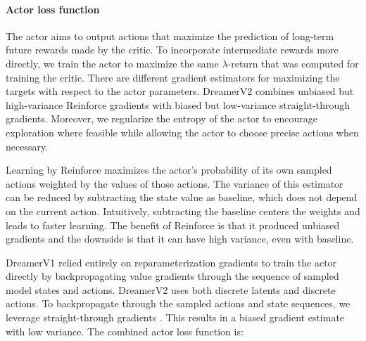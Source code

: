 \paragraph{Actor loss function}

The actor aims to output actions that maximize the prediction of long-term future rewards made by the critic. To incorporate intermediate rewards more directly, we train the actor to maximize the same $\lambda$-return that was computed for training the critic. There are different gradient estimators for maximizing the targets with respect to the actor parameters. DreamerV2 combines unbiased but high-variance Reinforce gradients with biased but low-variance straight-through gradients. Moreover, we regularize the entropy of the actor to encourage exploration where feasible while allowing the actor to choose precise actions when necessary.

Learning by Reinforce \citep{williams1992reinforce} maximizes the actor's probability of its own sampled actions weighted by the values of those actions. The variance of this estimator can be reduced by subtracting the state value as baseline, which does not depend on the current action. Intuitively, subtracting the baseline centers the weights and leads to faster learning. The benefit of Reinforce is that it produced unbiased gradients and the downside is that it can have high variance, even with baseline.

DreamerV1 relied entirely on reparameterization gradients \citep{kingma2013vae,rezende2014vae} to train the actor directly by backpropagating value gradients through the sequence of sampled model states and actions. DreamerV2 uses both discrete latents and discrete actions. To backpropagate through the sampled actions and state sequences, we leverage straight-through gradients \citep{bengio2013straight}. This results in a biased gradient estimate with low variance. The combined actor loss function is:


